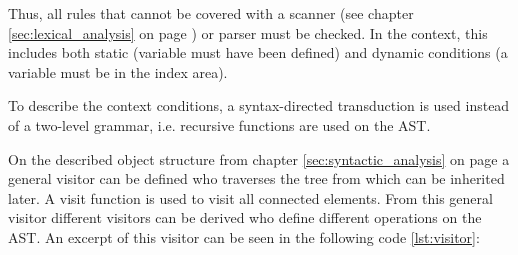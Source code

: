 Thus, all rules that cannot be covered with a scanner (see chapter \ref{sec:lexical_analysis} on page \pageref{sec:lexical_analysis}) or parser must be checked. In the context, this includes both static (variable must have been defined) and dynamic conditions (a variable must be in the index area).

To describe the context conditions, a syntax-directed transduction is used instead of a two-level grammar, i.e. recursive functions are used on the AST.

On the described object structure from chapter \ref{sec:syntactic_analysis} on page \pageref{sec:syntactic_analysis} a general visitor can be defined who traverses the tree from which can be inherited later. A visit function is used to visit all connected elements. From this general visitor different visitors can be derived who define different operations on the AST. An excerpt of this visitor can be seen in the following code \ref{lst:visitor}:



